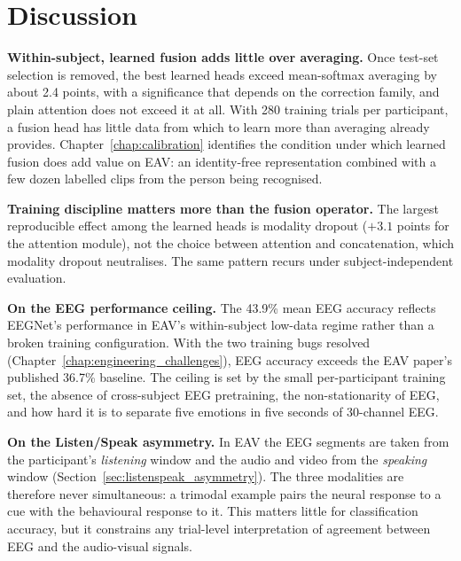 \section{Discussion}

\textbf{Within-subject, learned fusion adds little over averaging.} Once test-set selection is removed, the best learned heads exceed mean-softmax averaging by about 2.4 points, with a significance that depends on the correction family, and plain attention does not exceed it at all. With 280 training trials per participant, a fusion head has little data from which to learn more than averaging already provides. Chapter~\ref{chap:calibration} identifies the condition under which learned fusion does add value on EAV: an identity-free representation combined with a few dozen labelled clips from the person being recognised.

\textbf{Training discipline matters more than the fusion operator.} The largest reproducible effect among the learned heads is modality dropout ($+3.1$ points for the attention module), not the choice between attention and concatenation, which modality dropout neutralises. The same pattern recurs under subject-independent evaluation.

\textbf{On the EEG performance ceiling.} The 43.9\% mean EEG accuracy reflects EEGNet's performance in EAV's within-subject low-data regime rather than a broken training configuration. With the two training bugs resolved (Chapter~\ref{chap:engineering_challenges}), EEG accuracy exceeds the EAV paper's published 36.7\% baseline. The ceiling is set by the small per-participant training set, the absence of cross-subject EEG pretraining, the non-stationarity of EEG, and how hard it is to separate five emotions in five seconds of 30-channel EEG.

\textbf{On the Listen/Speak asymmetry.} In EAV the EEG segments are taken from the participant's \emph{listening} window and the audio and video from the \emph{speaking} window (Section~\ref{sec:listenspeak_asymmetry}). The three modalities are therefore never simultaneous: a trimodal example pairs the neural response to a cue with the behavioural response to it. This matters little for classification accuracy, but it constrains any trial-level interpretation of agreement between EEG and the audio-visual signals.
